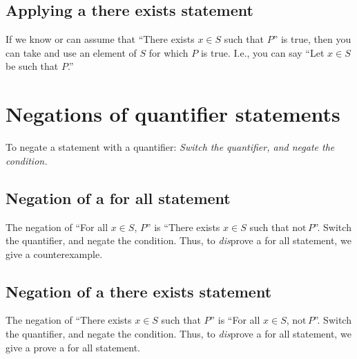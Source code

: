 \documentclass[12pt]{amsart}
\begin{document}
\subsection*{Applying a there exists statement}  If we know or can assume that ``There exists $x\in S$ such that $P$'' is true, then you can take and use an element of $S$ for which $P$ is true. I.e., you can say ``Let $x\in S$ be such that $P$.''

\section*{Negations of quantifier statements} To negate a statement with a quantifier: \emph{Switch the quantifier, and negate the condition.}

\subsection*{Negation of a for all statement} The negation of ``For all $x\in S$, $P$'' is ``There exists $x\in S$ such that $\mathrm{not} \, P$''.  Switch the quantifier, and negate the condition. Thus, to \emph{dis}prove a for all statement, we give a counterexample.

\subsection*{Negation of a there exists statement} The negation of ``There exists $x\in S$ such that $P$'' is ``For all $x\in S$, $\mathrm{not} \, P$''. Switch the quantifier, and negate the condition. Thus, to \emph{dis}prove a for all statement, we give a prove a for all statement.
\end{document}
